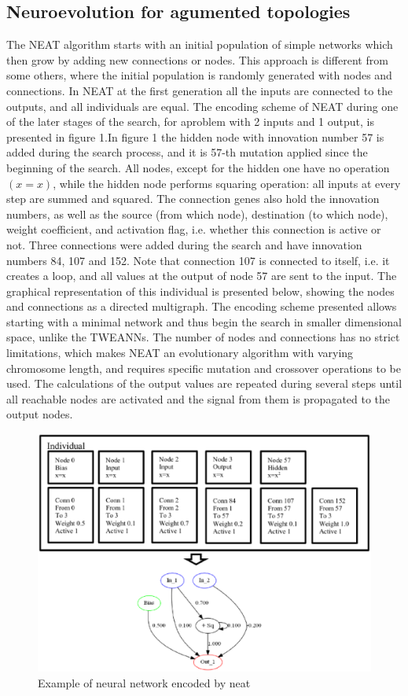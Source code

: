 \subsection{Neuroevolution for agumented topologies}
The NEAT algorithm starts with an initial population of simple networks which then grow by adding 
new connections or nodes.
This approach is different from some others, where the initial population is randomly generated 
with  nodes  and  connections. 
In NEAT at the first generation  all  the  inputs  are connected to the outputs, and all
individuals are equal. 
The encoding scheme of NEAT during one of the later stages of the search, for aproblem with 2 
inputs and 1 output, is presented in figure 1.In figure 1 the hidden node with innovation number 57
is added during the search process, and it is 57-th mutation applied since the
beginning of the search.
All nodes, except for the hidden one have no operation $(x = x)$, while the hidden node performs 
squaring operation: all inputs at every step are summed and squared.
The connection genes also hold the innovation numbers, as well as the source (from which node),
destination (to which node), weight coefficient, and activation flag, i.e. whether this connection
is active or not.
Three connections were added during the search and have innovation numbers 84, 107 and 152.
Note that connection 107 is connected to itself, i.e. it creates a loop, and all values at the 
output of  node  57  are  sent  to  the  input. 
The  graphical  representation  of  this  individual  is  presented  below, showing the nodes and
connections as a directed multigraph.
The encoding scheme  presented  allows  starting with a  minimal network and thus  begin the search
in smaller dimensional space, unlike the TWEANNs. 
The number of nodes and connections has no strict limitations, which makes NEAT an evolutionary
algorithm with varying chromosome length, and requires specific mutation and crossover operations 
to be used.
The calculations of the output values are  repeated  during  several  steps  until  all  reachable 
nodes  are  activated  and  the  signal  from  them  is propagated to the output nodes.
\begin{figure}[htb] 
	\label{fig:neat_encoding}
	\centering
	\includegraphics[width=\textwidth]{figures/neat_encoding}
	\caption{Example of neural network encoded by neat}
\end{figure}

